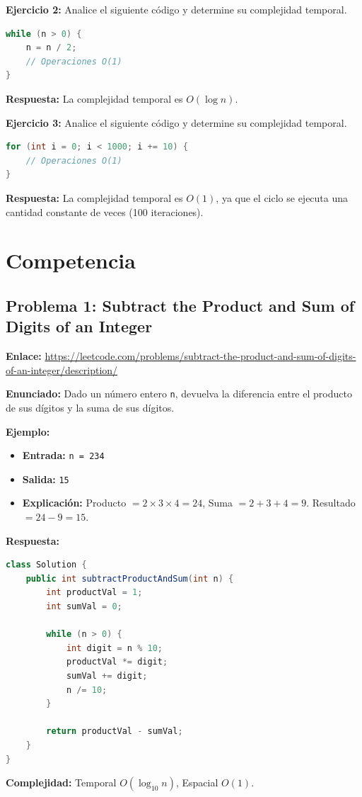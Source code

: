 \documentclass[11pt,a4paper]{article}
\begin{document}
\vspace{0.3cm}
\textbf{Ejercicio 2:} Analice el siguiente código y determine su complejidad temporal.
\begin{lstlisting}[language=Java]
while (n > 0) {
    n = n / 2;
    // Operaciones O(1)
}
\end{lstlisting}
\textbf{Respuesta:} La complejidad temporal es $O(\log n)$.

\vspace{0.3cm}
\textbf{Ejercicio 3:} Analice el siguiente código y determine su complejidad temporal.
\begin{lstlisting}[language=Java]
for (int i = 0; i < 1000; i += 10) {
    // Operaciones O(1)
}
\end{lstlisting}
\textbf{Respuesta:} La complejidad temporal es $O(1)$, ya que el ciclo se ejecuta una cantidad constante de veces (100 iteraciones).

\newpage
\section*{Competencia}

\subsection*{Problema 1: Subtract the Product and Sum of Digits of an Integer}
\textbf{Enlace:} \url{https://leetcode.com/problems/subtract-the-product-and-sum-of-digits-of-an-integer/description/}

\textbf{Enunciado:} Dado un número entero \texttt{n}, devuelva la diferencia entre el producto de sus dígitos y la suma de sus dígitos.

\textbf{Ejemplo:}
\begin{itemize}
    \item \textbf{Entrada:} \texttt{n = 234}
    \item \textbf{Salida:} \texttt{15}
    \item \textbf{Explicación:} Producto $= 2 \times 3 \times 4 = 24$, Suma $= 2 + 3 + 4 = 9$. Resultado $= 24 - 9 = 15$.
\end{itemize}

\textbf{Respuesta:}
\begin{lstlisting}[language=Java]
class Solution {
    public int subtractProductAndSum(int n) {
        int productVal = 1;
        int sumVal = 0;
        
        while (n > 0) {
            int digit = n % 10;
            productVal *= digit;
            sumVal += digit;
            n /= 10;
        }
        
        return productVal - sumVal;
    }
}
\end{lstlisting}
\textbf{Complejidad:} Temporal $O(\log_{10} n)$, Espacial $O(1)$.
\end{document}
